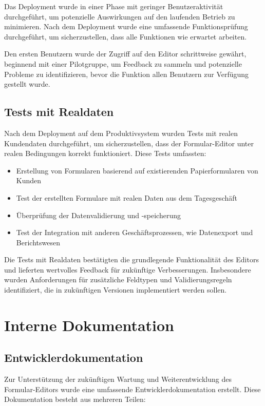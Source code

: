 \documentclass[a4paper,11pt]{article}
\begin{document}
Das Deployment wurde in einer Phase mit geringer Benutzeraktivität durchgeführt, um potenzielle Auswirkungen auf den laufenden Betrieb zu minimieren. Nach dem Deployment wurde eine umfassende Funktionsprüfung durchgeführt, um sicherzustellen, dass alle Funktionen wie erwartet arbeiten.

Den ersten Benutzern wurde der Zugriff auf den Editor schrittweise gewährt, beginnend mit einer Pilotgruppe, um Feedback zu sammeln und potenzielle Probleme zu identifizieren, bevor die Funktion allen Benutzern zur Verfügung gestellt wurde.

\subsection{Tests mit Realdaten}
Nach dem Deployment auf dem Produktivsystem wurden Tests mit realen Kundendaten durchgeführt, um sicherzustellen, dass der Formular-Editor unter realen Bedingungen korrekt funktioniert. Diese Tests umfassten:

\begin{itemize}
  \item Erstellung von Formularen basierend auf existierenden Papierformularen von Kunden
  \item Test der erstellten Formulare mit realen Daten aus dem Tagesgeschäft
  \item Überprüfung der Datenvalidierung und -speicherung
  \item Test der Integration mit anderen Geschäftsprozessen, wie Datenexport und Berichtswesen
\end{itemize}

Die Tests mit Realdaten bestätigten die grundlegende Funktionalität des Editors und lieferten wertvolles Feedback für zukünftige Verbesserungen. Insbesondere wurden Anforderungen für zusätzliche Feldtypen und Validierungsregeln identifiziert, die in zukünftigen Versionen implementiert werden sollen.

\section{Interne Dokumentation}
\subsection{Entwicklerdokumentation}
Zur Unterstützung der zukünftigen Wartung und Weiterentwicklung des Formular-Editors wurde eine umfassende Entwicklerdokumentation erstellt. Diese Dokumentation besteht aus mehreren Teilen:
\end{document}
